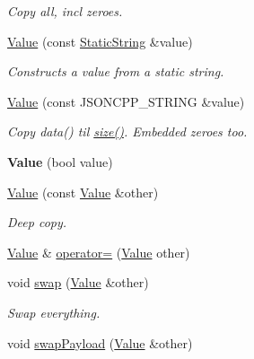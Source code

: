 \begin{DoxyCompactItemize}
\begin{DoxyCompactList}\small\item\em Copy all, incl zeroes. \end{DoxyCompactList}\item 
\hyperlink{classJson_1_1Value_a081830e95f88a37054da7e46c65b0766}{Value} (const \hyperlink{classJson_1_1StaticString}{Static\+String} \&value)
\begin{DoxyCompactList}\small\item\em Constructs a value from a static string. \end{DoxyCompactList}\item 
\hyperlink{classJson_1_1Value_a89ef37969ff7c6eb3a7afcca03d4cd4a}{Value} (const J\+S\+O\+N\+C\+P\+P\+\_\+\+S\+T\+R\+I\+NG \&value)\hypertarget{classJson_1_1Value_a89ef37969ff7c6eb3a7afcca03d4cd4a}{}\label{classJson_1_1Value_a89ef37969ff7c6eb3a7afcca03d4cd4a}

\begin{DoxyCompactList}\small\item\em Copy data() til \hyperlink{classJson_1_1Value_a0ec2808e1d7efa4e9fad938d6667be44}{size()}. Embedded zeroes too. \end{DoxyCompactList}\item 
{\bfseries Value} (bool value)\hypertarget{classJson_1_1Value_a350a31ea4a30d384994b0bc010b17495}{}\label{classJson_1_1Value_a350a31ea4a30d384994b0bc010b17495}

\item 
\hyperlink{classJson_1_1Value_a436dfd3670f95fd665f680eba5cebcf0}{Value} (const \hyperlink{classJson_1_1Value}{Value} \&other)\hypertarget{classJson_1_1Value_a436dfd3670f95fd665f680eba5cebcf0}{}\label{classJson_1_1Value_a436dfd3670f95fd665f680eba5cebcf0}

\begin{DoxyCompactList}\small\item\em Deep copy. \end{DoxyCompactList}\item 
\hyperlink{classJson_1_1Value}{Value} \& \hyperlink{classJson_1_1Value_a795acb28772da4c5d85ae8f4af36c69f}{operator=} (\hyperlink{classJson_1_1Value}{Value} other)
\item 
void \hyperlink{classJson_1_1Value_aab841120d78e296e1bc06a373345e822}{swap} (\hyperlink{classJson_1_1Value}{Value} \&other)\hypertarget{classJson_1_1Value_aab841120d78e296e1bc06a373345e822}{}\label{classJson_1_1Value_aab841120d78e296e1bc06a373345e822}

\begin{DoxyCompactList}\small\item\em Swap everything. \end{DoxyCompactList}\item 
void \hyperlink{classJson_1_1Value_a5263476047f20e2fc6de470e4de34fe5}{swap\+Payload} (\hyperlink{classJson_1_1Value}{Value} \&other)\hypertarget{classJson_1_1Value_a5263476047f20e2fc6de470e4de34fe5}{}\label{classJson_1_1Value_a5263476047f20e2fc6de470e4de34fe5}


\end{DoxyCompactItemize}
